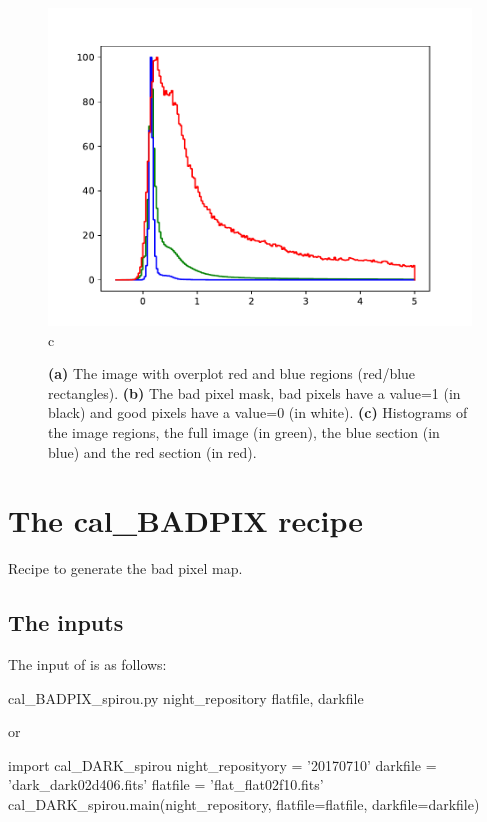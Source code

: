 \begin{figure}
\begin{center}
\begin{minipage}{.495\textwidth}
\begin{center}
\includegraphics[width=\textwidth]{Figures/cal_DARK_spirou_3.pdf}
c
\end{center}
\end{minipage}%
\end{center}

\caption{\textbf{(a)} The image with overplot red and blue regions (red/blue rectangles). \textbf{(b)} The bad pixel mask, bad pixels have a value=1 (in black) and good pixels have a value=0 (in white). \textbf{(c)} Histograms of the image regions, the full image (in green), the blue section (in blue) and the red section (in red). \label{figure:cal_DARK_spirou}}
\end{figure}



\clearpage
\newpage
\section{The cal\_BADPIX recipe}
\label{ch:the_recipes:cal_loc_RAW_spirou}

Recipe to generate the bad pixel map. \\

\subsection{The inputs}
The input of \calbadpix is as follows:
\begin{cmdbox}
cal_BADPIX_spirou.py  night_repository  flatfile, darkfile
\end{cmdbox}
\noindent or
\begin{pythonbox}
import cal_DARK_spirou
night_reposityory = '20170710'
darkfile = 'dark_dark02d406.fits'
flatfile = 'flat_flat02f10.fits'
cal_DARK_spirou.main(night_repository, flatfile=flatfile, darkfile=darkfile)
\end{pythonbox}

